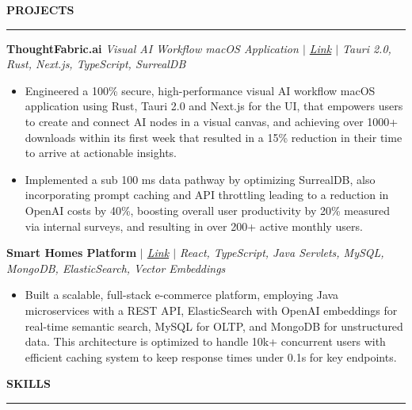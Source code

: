 \documentclass[10pt,letterpaper]{article}
\begin{document}
\vspace{mm}
{\hspace{0in}\small\textbf{PROJECTS}}\par
\vspace{-2mm}
\noindent\rule{\textwidth}{0.1pt}
\vspace{-4mm}

\hspace{0in}\textbf{ThoughtFabric.ai}  \textit{Visual AI Workflow macOS Application $|$ \href{https://thoughtfabric.ai}{Link} $|$ Tauri 2.0, Rust, Next.js, TypeScript, SurrealDB}
\begin{itemize}[leftmargin=0.15in,nosep,topsep=1pt,itemsep=0.5mm]
     \item Engineered a 100\% secure, high-performance visual AI workflow macOS application using Rust, Tauri 2.0 and Next.js for the UI, that empowers users to create and connect AI nodes in a visual canvas, and achieving over 1000+ downloads within its first week that resulted in a 15\% reduction in their time to arrive at actionable insights.   
     \item Implemented a sub 100 ms data pathway by optimizing SurrealDB, also incorporating prompt caching and API throttling leading to a reduction in OpenAI costs by 40\%, boosting overall user productivity by 20\% measured via internal surveys, and resulting in over 200+ active monthly users.
\end{itemize}

\hspace{0in}\textbf{Smart Homes Platform} \textit{$|$ \href{https://github.com/prajwal-svm/SmartHomes}{Link} $|$ React, TypeScript, Java Servlets, MySQL, MongoDB, ElasticSearch, Vector Embeddings}
\begin{itemize}[leftmargin=0.15in,nosep,topsep=1pt,itemsep=0.5mm]
  \item Built a scalable, full-stack e-commerce platform, employing Java microservices with a REST API, ElasticSearch with OpenAI embeddings for real-time semantic search, MySQL for OLTP, and MongoDB for unstructured data. This architecture is optimized to handle 10k+ concurrent users with efficient caching system to keep response times under 0.1s for key endpoints.
\end{itemize}

\vspace{2mm}
{\hspace{0in}\small\textbf{SKILLS}}\par
\vspace{-2mm}
\noindent\rule{\textwidth}{0.1pt}
\vspace{-4mm}
\end{document}

